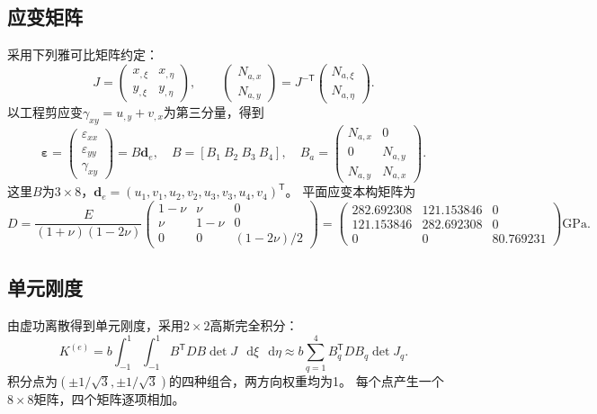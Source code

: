 \documentclass[UTF8,a4paper,fontset=fandol,10pt]{ctexart}
\newcommand{\dd}{\mathop{}\!\mathrm{d}}
\begin{document}
\subsection{应变矩阵}
采用下列雅可比矩阵约定：
\begin{equation}
J=\begin{pmatrix}x_{,\xi}&x_{,\eta}\\y_{,\xi}&y_{,\eta}\end{pmatrix},
\qquad
\begin{pmatrix}N_{a,x}\\N_{a,y}\end{pmatrix}
=J^{-\mathsf T}\begin{pmatrix}N_{a,\xi}\\N_{a,\eta}\end{pmatrix}.
\end{equation}
以工程剪应变$\gamma_{xy}=u_{,y}+v_{,x}$为第三分量，得到
\begin{equation}
\boldsymbol\varepsilon=\begin{pmatrix}\varepsilon_{xx}\\\varepsilon_{yy}\\\gamma_{xy}\end{pmatrix}
=B\mathbf d_e,\quad B=[B_1\ B_2\ B_3\ B_4],\quad
B_a=\begin{pmatrix}N_{a,x}&0\\0&N_{a,y}\\N_{a,y}&N_{a,x}\end{pmatrix}.
\end{equation}
这里$B$为$3\times8$，$\mathbf d_e=(u_1,v_1,u_2,v_2,u_3,v_3,u_4,v_4)^{\mathsf T}$。
平面应变本构矩阵为
\begin{equation}
D=\frac{E}{(1+\nu)(1-2\nu)}
\begin{pmatrix}1-\nu&\nu&0\\\nu&1-\nu&0\\0&0&(1-2\nu)/2\end{pmatrix}
=\begin{pmatrix}282.692308&121.153846&0\\121.153846&282.692308&0\\0&0&80.769231\end{pmatrix}\mathrm{GPa}.
\end{equation}

\subsection{单元刚度}
由虚功离散得到单元刚度，采用$2\times2$高斯完全积分：
\begin{equation}\label{eq:ke}
 K^{(e)}=b\int_{-1}^{1}\int_{-1}^{1}B^{\mathsf T}DB\det J\,\dd\xi\,\dd\eta
 \approx b\sum_{q=1}^{4}B_q^{\mathsf T}DB_q\det J_q.
\end{equation}
积分点为$(\pm1/\sqrt3,\pm1/\sqrt3)$的四种组合，两方向权重均为1。
每个点产生一个$8\times8$矩阵，四个矩阵逐项相加。
\end{document}
